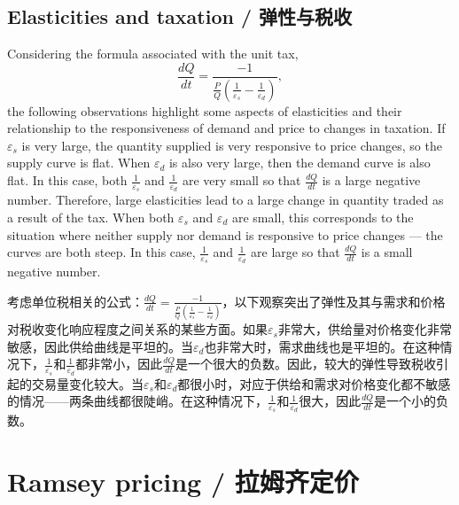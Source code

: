 \subsection{Elasticities and taxation / 弹性与税收}

\begin{original}
Considering the formula associated with the unit tax,
\[
\frac{dQ}{dt} = \frac{-1}{\frac{P}{Q}\left(\frac{1}{\varepsilon_s} - \frac{1}{\varepsilon_d}\right)},
\]
the following observations highlight some aspects of elasticities and their relationship to the responsiveness of demand and price to changes in taxation. If $\varepsilon_s$ is very large, the quantity supplied is very responsive to price changes, so the supply curve is flat. When $\varepsilon_d$ is also very large, then the demand curve is also flat. In this case, both $\frac{1}{\varepsilon_s}$ and $\frac{1}{\varepsilon_d}$ are very small so that $\frac{dQ}{dt}$ is a large negative number. Therefore, large elasticities lead to a large change in quantity traded as a result of the tax. When both $\varepsilon_s$ and $\varepsilon_d$ are small, this corresponds to the situation where neither supply nor demand is responsive to price changes --- the curves are both steep. In this case, $\frac{1}{\varepsilon_s}$ and $\frac{1}{\varepsilon_d}$ are large so that $\frac{dQ}{dt}$ is a small negative number.
\end{original}
\begin{translation}
考虑单位税相关的公式：$\frac{dQ}{dt} = \frac{-1}{\frac{P}{Q}\left(\frac{1}{\varepsilon_s} - \frac{1}{\varepsilon_d}\right)}$，以下观察突出了弹性及其与需求和价格对税收变化响应程度之间关系的某些方面。如果$\varepsilon_s$非常大，供给量对价格变化非常敏感，因此供给曲线是平坦的。当$\varepsilon_d$也非常大时，需求曲线也是平坦的。在这种情况下，$\frac{1}{\varepsilon_s}$和$\frac{1}{\varepsilon_d}$都非常小，因此$\frac{dQ}{dt}$是一个很大的负数。因此，较大的弹性导致税收引起的交易量变化较大。当$\varepsilon_s$和$\varepsilon_d$都很小时，对应于供给和需求对价格变化都不敏感的情况——两条曲线都很陡峭。在这种情况下，$\frac{1}{\varepsilon_s}$和$\frac{1}{\varepsilon_d}$很大，因此$\frac{dQ}{dt}$是一个小的负数。
\end{translation}

\section{Ramsey pricing / 拉姆齐定价}


